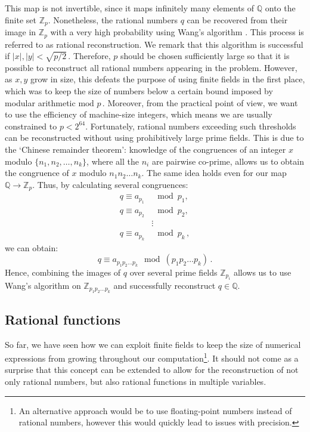 \documentclass[main.tex]{subfiles}
\begin{document}
This map is not invertible, since it maps infinitely many elements of $\mathbb{Q}$ onto the finite set $\mathbb{Z}_p$. Nonetheless, the rational numbers $q$ can be recovered from their image in $\mathbb{Z}_p$ with a very high probability using Wang's algorithm \cite{10.1145/800206.806398, 10.1145/1089292.1089293}. This process is referred to as rational reconstruction. We remark that this algorithm is successful if  $|x|, |y| < \sqrt{p/2}\,$. Therefore, $p$ should be chosen sufficiently large so that it is possible to reconstruct all rational numbers appearing in the problem. However, as $x, y$ grow in size, this defeats the purpose of using finite fields in the first place, which was to keep the size of numbers below a certain bound imposed by modular arithmetic $\text{mod } p\,$. Moreover, from the practical point of view, we want to use the efficiency of machine-size integers, which means we are usually constrained to $p<2^{64}$. Fortunately, rational numbers exceeding such thresholds can be reconstructed without using prohibitively large prime fields. This is due to the `Chinese remainder theorem': knowledge of the congruences of an integer $x$ modulo $\{n_1, n_2, \ldots, n_k\}$, where all the $n_i$ are pairwise co-prime, allows us to obtain the congruence of $x$ modulo $n_1n_2\ldots n_k$. The same idea holds even for our map $\mathbb{Q} \rightarrow \mathbb{Z}_p$. Thus, by calculating several congruences:
\begin{align}
    q \equiv a_{p_1} &\mod p_1, \nonumber \\
    q \equiv a_{p_2} &\mod p_2, \nonumber \\
    &\vdots \nonumber \\
    q \equiv a_{p_k} &\mod p_k\,,
\end{align}
we can obtain:
\begin{equation}
    q \equiv a_{p_1 p_2 \ldots p_k} \mod (p_1 p_2 \ldots p_k)\,.
\end{equation}
Hence, combining the images of $q$ over several prime fields $\mathbb{Z}_{p_i}$ allows us to use Wang's algorithm on $\mathbb{Z}_{p_1 p_2 \ldots p_k}$ and successfully reconstruct $q \in \mathbb{Q}$.
\subsection{Rational functions} \label{sec:ratfuncs}
So far, we have seen how we can exploit finite fields to keep the size of numerical expressions from growing throughout our computation\footnote{An alternative approach would be to use floating-point numbers instead of rational numbers, however this would quickly lead to issues with precision.}. It should not come as a surprise that this concept can be extended to allow for the reconstruction of not only rational numbers, but also rational functions in multiple variables. 
\end{document}
